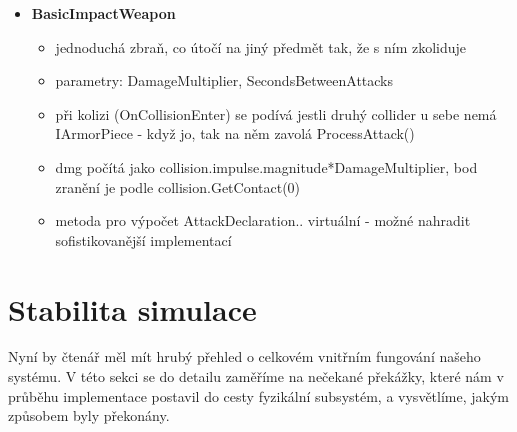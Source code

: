 \begin{itemize}
\begin{itemize}
      \end{itemize} 
  \item \textbf{BasicImpactWeapon}
      \begin{itemize}
        \item jednoduchá zbraň, co útočí na jiný předmět tak, že s ním zkoliduje 
        \item parametry: DamageMultiplier, SecondsBetweenAttacks
        \item při kolizi (OnCollisionEnter) se podívá jestli druhý collider u sebe nemá IArmorPiece - když jo, tak na něm zavolá ProcessAttack()
        \item dmg počítá jako collision.impulse.magnitude*DamageMultiplier, bod zranění je podle collision.GetContact(0)
        \item metoda pro výpočet AttackDeclaration.. virtuální - možné nahradit sofistikovanější implementací
      \end{itemize} 
  
\end{itemize}




\section{Stabilita simulace} \label{simulationStabilitySection}

Nyní by čtenář měl mít hrubý přehled o celkovém vnitřním fungování našeho systému. V této sekci se do detailu zaměříme na nečekané překážky, které nám v průběhu implementace postavil do cesty fyzikální subsystém, a vysvětlíme, jakým způsobem byly překonány.


